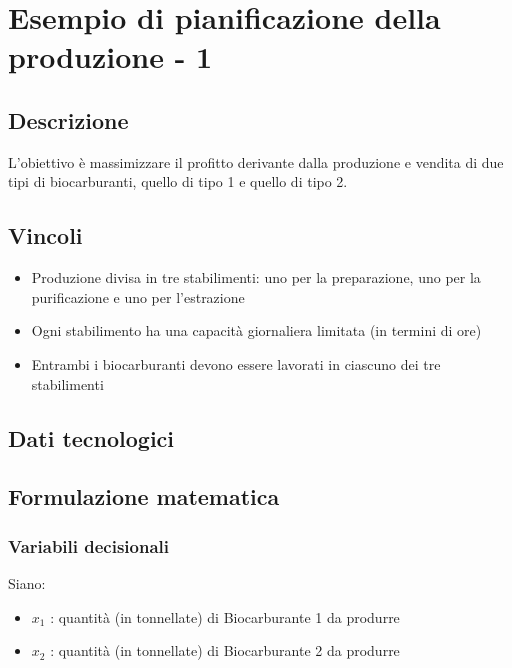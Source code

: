 \section{Esempio di pianificazione della produzione - 1}

\subsection{Descrizione}
L'obiettivo è massimizzare il profitto derivante dalla produzione e vendita di due tipi di biocarburanti, quello di tipo 1 e quello di tipo 2.

\subsection{Vincoli}
\begin{itemize}
    \item Produzione divisa in tre stabilimenti: uno per la preparazione, uno per la purificazione e uno per l'estrazione
    \item Ogni stabilimento ha una capacità giornaliera limitata (in termini di ore)
    \item Entrambi i biocarburanti devono essere lavorati in ciascuno dei tre stabilimenti
\end{itemize}

\subsection{Dati tecnologici}
\begin{table}[h]
\centering
{}
\end{table}

\subsection{Formulazione matematica}

\subsubsection{Variabili decisionali}
Siano:
\begin{itemize}
    \item $x_1$ : quantità (in tonnellate) di Biocarburante 1 da produrre
    \item $x_2$ : quantità (in tonnellate) di Biocarburante 2 da produrre
\end{itemize}

